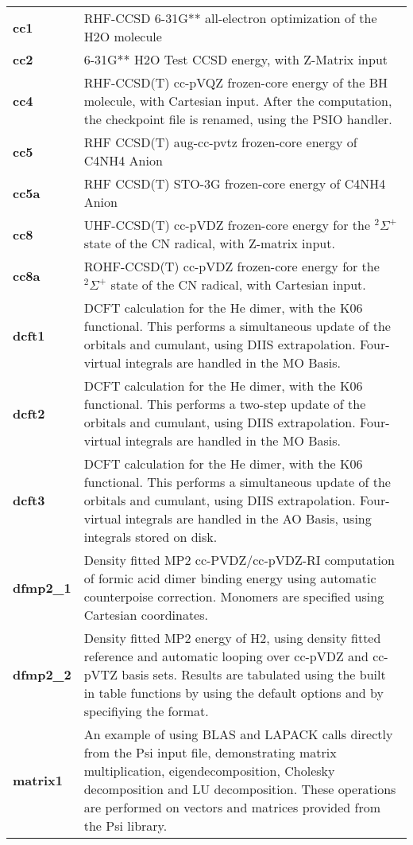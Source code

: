 \begin{tabular*}{\textwidth}[tb]{p{}p{}}
{\bf cc1} &  RHF-CCSD 6-31G** all-electron optimization of the H2O molecule\\
{\bf cc2} &  6-31G** H2O Test CCSD energy, with Z-Matrix input\\
{\bf cc4} &  RHF-CCSD(T) cc-pVQZ frozen-core energy of the BH molecule, with Cartesian input. After the computation, the checkpoint file is renamed, using the PSIO handler.\\
{\bf cc5} &  RHF CCSD(T) aug-cc-pvtz frozen-core energy of C4NH4 Anion\\
{\bf cc5a} &  RHF CCSD(T) STO-3G frozen-core energy of C4NH4 Anion\\
{\bf cc8} &  UHF-CCSD(T) cc-pVDZ frozen-core energy for the $^2\Sigma^+$ state of the CN radical, with Z-matrix input.\\
{\bf cc8a} &  ROHF-CCSD(T) cc-pVDZ frozen-core energy for the $^2\Sigma^+$ state of the CN radical, with Cartesian input.\\
{\bf dcft1} &  DCFT calculation for the He dimer, with the K06 functional. This performs a simultaneous update of the orbitals and cumulant, using DIIS extrapolation. Four-virtual integrals are handled in the MO Basis.\\
{\bf dcft2} &  DCFT calculation for the He dimer, with the K06 functional. This performs a two-step update of the orbitals and cumulant, using DIIS extrapolation. Four-virtual integrals are handled in the MO Basis.\\
{\bf dcft3} &  DCFT calculation for the He dimer, with the K06 functional. This performs a simultaneous update of the orbitals and cumulant, using DIIS extrapolation. Four-virtual integrals are handled in the AO Basis, using integrals stored on disk.\\
{\bf dfmp2_1} &  Density fitted MP2 cc-PVDZ/cc-pVDZ-RI computation of formic acid dimer binding energy using automatic counterpoise correction.  Monomers are specified using Cartesian coordinates.\\
{\bf dfmp2_2} &  Density fitted MP2 energy of H2, using density fitted reference and automatic looping over cc-pVDZ and cc-pVTZ basis sets. Results are tabulated using the built in table functions by using the default options and by specifiying the format.\\
{\bf matrix1} &  An example of using BLAS and LAPACK calls directly from the Psi input file, demonstrating matrix multiplication, eigendecomposition, Cholesky decomposition and LU decomposition. These operations are performed on vectors and matrices provided from the Psi library.\\

\end{tabular*}
